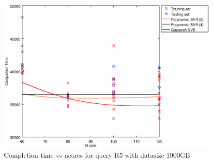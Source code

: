 
\begin {figure}[hbtp]
\centering
\includegraphics[width=\textwidth]{output/R5_1000_1_OVER_NCORES/plot_R5_1000_bestmodels.eps}
\caption{Completion time vs ncores for query R5 with datasize 1000GB}
\label{fig:all_nonlinear_R5_1000}
\end {figure}
